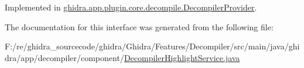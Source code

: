 Implemented in \mbox{\hyperlink{classghidra_1_1app_1_1plugin_1_1core_1_1decompile_1_1_decompiler_provider_a128dd05b94cfa8445f1fe80bc1410ee8}{ghidra.\+app.\+plugin.\+core.\+decompile.\+Decompiler\+Provider}}.



The documentation for this interface was generated from the following file\+:\begin{DoxyCompactItemize}
\item 
F\+:/re/ghidra\+\_\+sourcecode/ghidra/\+Ghidra/\+Features/\+Decompiler/src/main/java/ghidra/app/decompiler/component/\mbox{\hyperlink{_decompiler_highlight_service_8java}{Decompiler\+Highlight\+Service.\+java}}\end{DoxyCompactItemize}
